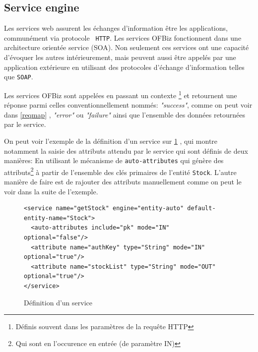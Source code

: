 \subsection{Service engine}
Les services web assurent les échanges d'information être les applications, communément via protocole \verb| HTTP|.   
Les services OFBiz fonctionnent dans une architecture orientée service (SOA). Non seulement ces services ont une capacité d'évoquer les autres intérieurement, mais peuvent aussi être appelés par une application extérieure en utilisant des protocoles d'échange d'information telles que \verb|SOAP|. 

Les services OFBiz sont appelées en passant un contexte \footnote{Définis souvent dans les paramètres de la requête HTTP } et retournent une réponse parmi celles conventionnellement nommés: \emph{"success"}, comme on peut voir dans  \ref{reqmap} , \emph{"error"} ou \emph{"failure"} ainsi que l'ensemble des données retournées par le service. 

On peut voir l'exemple de la définition d'un service sur \ref{servicedef} , qui montre notamment la saisie des attributs attendu par le service qui sont définis de deux manières: En utilisant le mécanisme de \verb|auto-attributes| qui génère des attributs\footnote{Qui sont en l'occurence en entrée (de paramètre IN)} à partir de l'ensemble des clés primaires de l'entité \verb|Stock|. L'autre manière de faire est de rajouter des attributs manuellement comme on peut le voir dans la suite de l'exemple. 


\begin{figure}
\begin{lstlisting}
<service name="getStock" engine="entity-auto" default-entity-name="Stock">
  <auto-attributes include="pk" mode="IN" optional="false"/>
  <attribute name="authKey" type="String" mode="IN" optional="true"/>
  <attribute name="stockList" type="String" mode="OUT" optional="true"/>
</service>
\end{lstlisting}
\caption{Définition d'un service}
\label{servicedef}
\end{figure}


